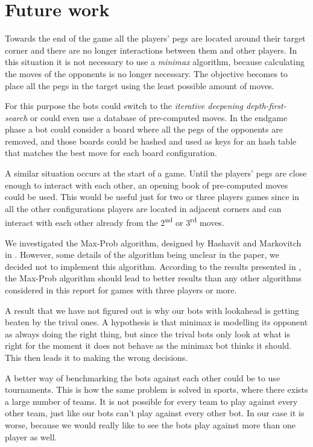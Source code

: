 
\section{Future work}

Towards the end of the game all the players' pegs are located around
their target corner and there are no longer interactions between them
and other players. In this situation it is not necessary to use a
\emph{minimax} algorithm, because calculating the moves of the
opponents is no longer necessary. The objective becomes to place
all the pegs in the target using the least possible amount of moves.

For this purpose the bots could switch to the \emph{iterative
  deepening depth-first-search} or could even use a database of
pre-computed moves. In the endgame phase a bot could consider a board
where all the pegs of the opponents are removed, and those boards
could be hashed and used as keys for an hash table that matches the
best move for each board configuration.

A similar situation occurs at the start of a game.
Until the players' pegs are close enough to interact with each other, an opening
book of pre-computed moves could be used. This would be useful just for two or
three players games since in all the other configurations players are located in
adjacent corners and can interact with each other already from the
 2\textsuperscript{nd} or 3\textsuperscript{rd} moves.

We investigated the Max-Prob algorithm, designed by Hashavit and
Mar\-ko\-vi\-tch in \cite{Hashavit}. However, some details of the
algorithm being unclear in the paper, we decided not to implement this
algorithm. According to the results presented in \cite{Hashavit}, the
Max-Prob algorithm should lead to better results than any other
algorithms considered in this report for games with three players or
more.



A result that we have not figured out is why our bots with lookahead
is getting beaten by the trival ones. A hypothesis is that minimax is
modelling its opponent as always doing the right thing, but since the
trival bots only look at what is right for the moment it does not
behave as the minimax bot thinks it should. This then leads it to
making the wrong decisions.

A better way of benchmarking the bots against each other could be to
use tournaments. This is how the same problem is solved in sports,
where there exists a large number of teams. It is not possible for
every team to play against every other team, just like our bots can't
play against every other bot. In our case it is worse, because we
would really like to see the bots play against more than one player as
well.

